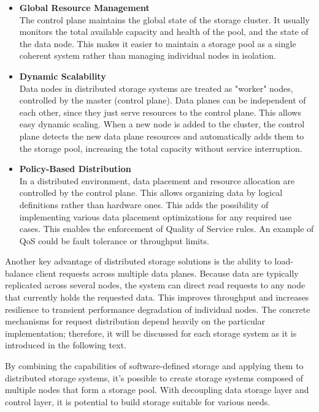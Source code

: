 \begin{itemize}
    \item \textbf{Global Resource Management}  \\
    The control plane maintains the global state of the storage cluster. It usually monitors the total available capacity and health of the pool, and the state of the data node. This makes it easier to maintain a storage pool as a single coherent system rather than managing individual nodes in isolation.
    \item \textbf{Dynamic Scalability} \\
    Data nodes in distributed storage systems are treated as "worker" nodes, controlled by the master (control plane). Data planes can be independent of each other, since they just serve resources to the control plane. This allows easy dynamic scaling. When a new node is added to the cluster, the control plane detects the new data plane resources and automatically adds them to the storage pool, increasing the total capacity without service interruption.
    \item \textbf{Policy-Based Distribution} \\
    In a distributed environment, data placement and resource allocation are controlled by the control plane. This allows organizing data by logical definitions rather than hardware ones. This adds the possibility of implementing various data placement optimizations for any required use cases.  This enables the enforcement of Quality of Service rules. An example of QoS could be fault tolerance or throughput limits.
\end{itemize}
\cite{mark_carlson_software_2015, macedo_survey_2021, moucha_software_2021}

Another key advantage of distributed storage solutions is the ability to load-balance client requests across multiple data planes. Because data are typically replicated across several nodes, the system can direct read requests to any node that currently holds the requested data. This improves throughput and increases resilience to transient performance degradation of individual nodes. The concrete mechanisms for request distribution depend heavily on the particular implementation; therefore, it will be discussed for each storage system as it is introduced in the following text. \cite{macedo_survey_2021, moucha_software_2021}

\vspace{1.5em}

By combining the capabilities of software-defined storage and applying them to distributed storage systems, it's possible to create storage systems composed of multiple nodes that form a storage pool. With decoupling data storage layer and control layer, it is potential to build storage suitable for various needs. 

